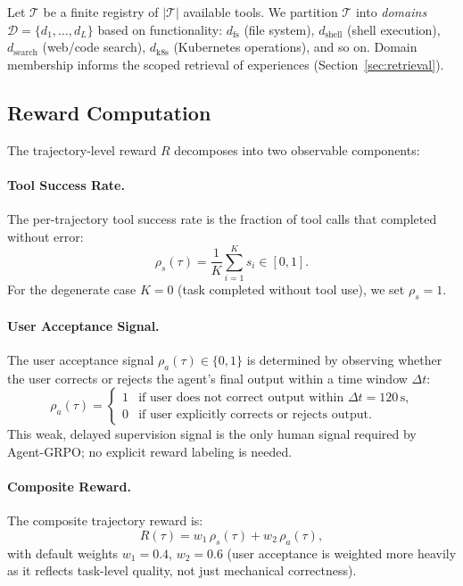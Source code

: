 \documentclass[11pt]{article}
\begin{document}
Let $\mathcal{T}$ be a finite registry of $|\mathcal{T}|$ available tools.
We partition $\mathcal{T}$ into \emph{domains} $\mathcal{D} =
\{d_1, \ldots, d_L\}$ based on functionality: $d_{\text{fs}}$ (file system),
$d_{\text{shell}}$ (shell execution), $d_{\text{search}}$ (web/code search),
$d_{\text{k8s}}$ (Kubernetes operations), and so on. Domain membership informs
the scoped retrieval of experiences (Section~\ref{sec:retrieval}).

\subsection{Reward Computation}
\label{sec:reward}

The trajectory-level reward $R$ decomposes into two observable components:

\paragraph{Tool Success Rate.}
The per-trajectory tool success rate is the fraction of tool calls that
completed without error:
\begin{equation}
    \rho_s(\tau) = \frac{1}{K} \sum_{i=1}^K s_i \in [0, 1].
    \label{eq:tool-success}
\end{equation}
For the degenerate case $K = 0$ (task completed without tool use), we set
$\rho_s = 1$.

\paragraph{User Acceptance Signal.}
The user acceptance signal $\rho_a(\tau) \in \{0, 1\}$ is determined by
observing whether the user corrects or rejects the agent's final output within
a time window $\Delta t$:
\begin{equation}
    \rho_a(\tau) =
    \begin{cases}
        1 & \text{if user does not correct output within } \Delta t = 120\,\text{s,} \\
        0 & \text{if user explicitly corrects or rejects output.}
    \end{cases}
    \label{eq:user-accept}
\end{equation}
This weak, delayed supervision signal is the only human signal required by
Agent-GRPO; no explicit reward labeling is needed.

\paragraph{Composite Reward.}
The composite trajectory reward is:
\begin{equation}
    R(\tau) = w_1\,\rho_s(\tau) + w_2\,\rho_a(\tau),
    \label{eq:composite-reward}
\end{equation}
with default weights $w_1 = 0.4$, $w_2 = 0.6$ (user acceptance is weighted
more heavily as it reflects task-level quality, not just mechanical correctness).
\end{document}
